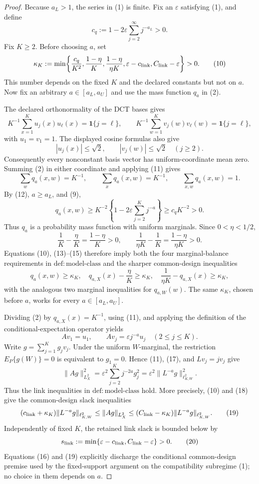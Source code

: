 \documentclass{article}
\begin{document}
\begin{proof}
Because \(a_L>1\), the series in (1) is finite.  Fix an \(\varepsilon\) satisfying (1), and define
\[
c_q:=1-2\varepsilon\sum_{j=2}^{\infty}j^{-a_L}>0.
\tag{9}
\]
Fix \(K\ge2\).  Before choosing \(a\), set
\[
\kappa_K:=\min\!\left\{
\frac{c_q}{K^2},\frac{1-\eta}{K},
\frac{1-\eta}{\eta K},
\varepsilon-c_{\rm link},C_{\rm link}-\varepsilon
\right\}>0.
\tag{10}
\]
This number depends on the fixed \(K\) and the declared constants but not on \(a\).  Now fix an arbitrary \(a\in[a_L,a_U]\) and use the mass function \(q_a\) in (2).

The declared orthonormality of the DCT bases gives
\[
K^{-1}\sum_{x=1}^Ku_j(x)u_\ell(x)=\mathbf 1\{j=\ell\},
\qquad
K^{-1}\sum_{w=1}^Kv_j(w)v_\ell(w)=\mathbf 1\{j=\ell\},
\tag{11}
\]
with \(u_1=v_1=1\).  The displayed cosine formulas also give
\[
|u_j(x)|\le\sqrt2,
\qquad
|v_j(w)|\le\sqrt2
\quad (j\ge2).
\tag{12}
\]
Consequently every nonconstant basis vector has uniform-coordinate mean zero.  Summing (2) in either coordinate and applying (11) gives
\[
\sum_wq_a(x,w)=K^{-1},
\qquad
\sum_xq_a(x,w)=K^{-1},
\qquad
\sum_{x,w}q_a(x,w)=1.
\tag{13}
\]
By (12), \(a\ge a_L\), and (9),
\[
q_a(x,w)
\ge K^{-2}\left\{1-2\varepsilon\sum_{j=2}^Kj^{-a}\right\}
\ge c_qK^{-2}>0.
\tag{14}
\]
Thus \(q_a\) is a probability mass function with uniform marginals.  Since \(0<\eta<1/2\),
\[
\frac1K-\frac{\eta}{K}=\frac{1-\eta}{K}>0,
\qquad
\frac{1}{\eta K}-\frac1K=\frac{1-\eta}{\eta K}>0.
\tag{15}
\]
Equations (10), (13)--(15) therefore imply both the four marginal-balance requirements in \(\mathrm{def:model\mbox{-}class}\) and the sharper common-design inequalities
\[
q_a(x,w)\ge\kappa_K,
\quad
q_{a,X}(x)-\frac\eta K\ge\kappa_K,
\quad
\frac1{\eta K}-q_{a,X}(x)\ge\kappa_K,
\tag{16}
\]
with the analogous two marginal inequalities for \(q_{a,W}(w)\).  The same \(\kappa_K\), chosen before \(a\), works for every \(a\in[a_L,a_U]\).

Dividing (2) by \(q_{a,X}(x)=K^{-1}\), using (11), and applying the definition of the conditional-expectation operator yields
\[
Av_1=u_1,
\qquad
Av_j=\varepsilon j^{-a}u_j
\quad (2\le j\le K).
\tag{17}
\]
Write \(g=\sum_{j=1}^Kg_jv_j\).  Under the uniform \(W\)-marginal, the restriction \(E_P\{g(W)\}=0\) is equivalent to \(g_1=0\).  Hence (11), (17), and \(Lv_j=jv_j\) give
\[
\|Ag\|_{L^2_X}^2
=\varepsilon^2\sum_{j=2}^Kj^{-2a}g_j^2
=\varepsilon^2\|L^{-a}g\|_{\ell^2_{K,W}}^2.
\tag{18}
\]
Thus the link inequalities in \(\mathrm{def:model\mbox{-}class}\) hold.  More precisely, (10) and (18) give the common-design slack inequalities
\[
(c_{\rm link}+\kappa_K)\|L^{-a}g\|_{\ell^2_{K,W}}
\le \|Ag\|_{L^2_X}
\le (C_{\rm link}-\kappa_K)\|L^{-a}g\|_{\ell^2_{K,W}}.
\tag{19}
\]
Independently of fixed \(K\), the retained link slack is bounded below by
\[
s_{\rm link}:=\min\{\varepsilon-c_{\rm link},C_{\rm link}-\varepsilon\}>0.
\tag{20}
\]
Equations (16) and (19) explicitly discharge the conditional common-design premise used by the fixed-support argument on the compatibility subregime (1); no choice in them depends on \(a\).


\end{proof}
\end{document}
